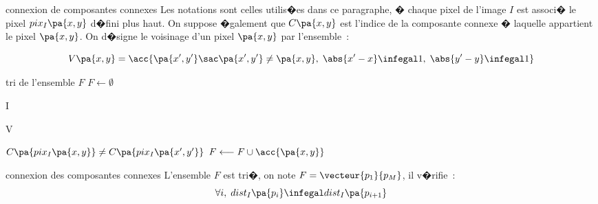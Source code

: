             \begin{xalgorithm}{connexion de composantes connexes}
            Les notations sont celles utilis�es dans ce paragraphe, � chaque pixel de l'image $I$ est associ� le pixel
            $pix_I\pa{x,y}$ d�fini plus haut. On suppose �galement que $C\pa{x,y}$ est l'indice de la composante 
            connexe � laquelle appartient le pixel $\pa{x,y}$. On d�signe le voisinage d'un pixel $\pa{x,y}$
            par l'ensemble~:
                    
                    $$
                    V\pa{x,y} = \acc{ \pa{x',y'} \sac \pa{x',y'} \neq \pa{x,y}, \; \abs{x'-x} \infegal 1, 
                                                                \; \abs{y'-y} \infegal 1 }
                    $$

            \begin{xalgostep}{tri de l'ensemble $F$}
            $F \longleftarrow \emptyset$ \\
            \begin{xforeach}{}{I}
                \begin{xforeach}{}{V}                
                    \begin{xif}{$C\pa{pix_I\pa{x,y}} \neq C\pa{pix_I\pa{x',y'}}$}
                            $F \longleftarrow F \cup \acc{ \pa{x,y} }$
                    \end{xif}
                \end{xforeach}
            \end{xforeach}
            \end{xalgostep}

            \begin{xalgostep}{connexion des composantes connexes}
            L'ensemble $F$ est tri�, on note $F = \vecteur{p_1}{p_M}$, il v�rifie~:
                    $$
                            \forall i, \; dist_I\pa{p_i} \infegal dist_I\pa{p_{i+1}}
                    $$
            \end{xalgostep}
            
            

\end{xalgorithm}
